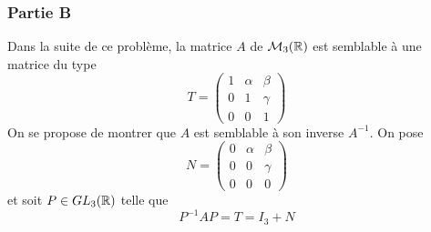 \subsubsection*{Partie B}
Dans la suite de ce problème, la matrice $A$ de $\mathcal{M}_3(\mathbb{R})$ est semblable à une matrice du type
\begin{displaymath}
T = \left( \begin{array}{ccc}
1 & \alpha & \beta \\ 
0 & 1 & \gamma \\ 
0 & 0 & 1
    \end{array}\right) 
\end{displaymath}
On se propose de montrer que $A$ est semblable à son inverse $A^{-1}$.\newline
On pose
\begin{displaymath}
N = \left( \begin{array}{ccc}
0 & \alpha & \beta \\ 
0 & 0 & \gamma \\ 
0 & 0 & 0
    \end{array}\right) 
\end{displaymath}
 et soit $P\in GL_3(\mathbb{R})$ telle que 
\[P^{-1}AP=T=I_3+N\]
